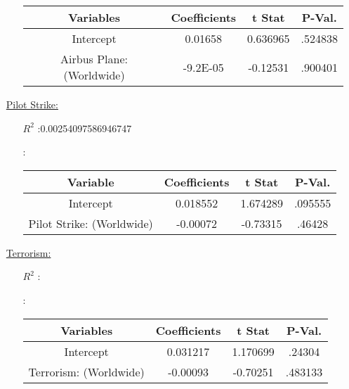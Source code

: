 \documentclass[12pt]{report}
\begin{document}
\begin{enumerate}
\begin{enumerate}
                \begin{tabular}{|c|c|c|c|}
                    \toprule \hline
                    \textbf{Variables} & \textbf{Coefficients} & \textbf{t Stat} & \textbf{P-Val.}\\ \hline

                    Intercept & 0.01658 & 0.636965 &.524838 \\ \hline
                    Airbus Plane: (Worldwide) & -9.2E-05 & -0.12531 &.900401 \\ \hline
                    \bottomrule
                \end{tabular}




        \end{enumerate}
    \item[\underline{Pilot Strike:}]
        \begin{enumerate}
            \item[$R^2$]:0.00254097586946747
            \item[]:


                \begin{tabular}{|c|c|c|c|}
                    \toprule \hline
                    \textbf{Variable} & \textbf{Coefficients} & \textbf{t Stat}& \textbf{P-Val.} \\ \hline

                    Intercept & 0.018552 & 1.674289& .095555\\ \hline
                    Pilot Strike: (Worldwide) & -0.00072 & -0.73315 &.46428 \\ \hline
                    \bottomrule
                \end{tabular}





        \end{enumerate}
    \item[\underline{Terrorism:}]
        \begin{enumerate}
            \item[$R^2$]:
            \item[]:

                \begin{tabular}{|c|c|c|c|}
                    \toprule \hline
                    \textbf{Variables} & \textbf{Coefficients} & \textbf{t Stat} &\textbf{P-Val.}\\ \hline

                    Intercept & 0.031217 & 1.170699& .24304\\ \hline
                    Terrorism: (Worldwide) & -0.00093 & -0.70251 &.483133 \\ \hline
                    \bottomrule
                \end{tabular}






\end{enumerate}
\end{enumerate}
\end{document}
